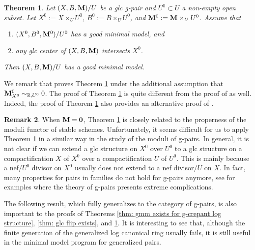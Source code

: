 \documentclass[11pt]{amsart}
\numberwithin{equation}{section}
\newcommand{\Mm}{{\bf{M}}}
\newtheorem{thm}{Theorem}[section]
\theoremstyle{definition}
\theoremstyle{definition}
\newtheorem{rem}[thm]{Remark}
\theoremstyle{definition}
\begin{document}
\begin{thm}\label{thm: gmm over U0 implies gmm over U}
Let $(X,B,\Mm)/U$ be a glc g-pair and $U^0\subset U$ a non-empty open subset. Let $X^0:=X\times_UU^0$, $B^0:=B\times_UU^0$, and $\Mm^0:=\Mm\times_UU^0$. Assume that
\begin{enumerate}
\item $(X^0,B^0,\Mm^0)/U^0$ has a good minimal model, and
\item any glc center of $(X,B,\Mm)$ intersects $X^0$.
\end{enumerate}
Then $(X,B,\Mm)/U$ has a good minimal model.
\end{thm}

We remark that \cite[Theorem 1.1]{HL21a} proves Theorem \ref{thm: gmm over U0 implies gmm over U} under the additional assumption that $\Mm^0_{X^0}\sim_{\mathbb R,U^0}0$. The proof of Theorem \ref{thm: gmm over U0 implies gmm over U} is quite different from the proof of \cite[Theorem 1.1]{HL21a} as well. Indeed, the proof of Theorem \ref{thm: gmm over U0 implies gmm over U} also provides an alternative proof of \cite[Theorem 1.1]{HL21a}.

\begin{rem}
When $\Mm=\bm{0}$, Theorem \ref{thm: gmm over U0 implies gmm over U} is closely related to the properness of the moduli functor of stable schemes. Unfortunately, it seems difficult for us to apply Theorem \ref{thm: gmm over U0 implies gmm over U} in a similar way in the study of the moduli of g-pairs. In general, it is not clear if we can extend a glc structure on $X^0$ over $U^0$ to a glc structure on a compactification $X$ of $X^0$ over a compactification $U$ of $U^0$. This is mainly because a nef$/U^0$ divisor on $X^0$ usually does not extend to a nef divisor$/U$ on $X$. In fact, many properties for pairs in families do not hold for g-pairs anymore, see \cite{BH22} for examples where the theory of g-pairs presents extreme complications.
\end{rem}



The following result, which fully generalizes \cite[Theorem 1.5]{Bir12} to the category of g-pairs, is also important to the proofs of Theorems \ref{thm: gmm exists for g-crepant log structure}, \ref{thm: glc flip exists}, and \ref{thm: gmm over U0 implies gmm over U}. It is interesting to see that, although the finite generation of the generalized log canonical ring usually fails, it is still useful in the minimal model program for generalized pairs.
\end{document}

